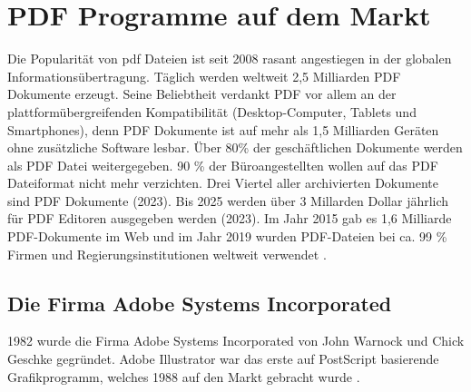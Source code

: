 \chapter{PDF Programme auf dem Markt}
Die Popularität von \gls{pdf} Dateien ist seit 2008 rasant angestiegen in der globalen Informationsübertragung. Täglich werden weltweit 2,5 Milliarden PDF Dokumente erzeugt. Seine Beliebtheit verdankt PDF vor allem an der plattformübergreifenden Kompatibilität (Desktop-Computer, Tablets und Smartphones), denn PDF Dokumente ist auf mehr als 1,5 Milliarden Geräten ohne zusätzliche Software lesbar. Über 80\% der geschäftlichen Dokumente werden als PDF Datei weitergegeben. \cite{formilo} 90 \% der Büroangestellten wollen auf das PDF Dateiformat nicht mehr verzichten. Drei Viertel aller archivierten Dokumente sind PDF Dokumente (2023).
Bis 2025 werden über 3 Millarden Dollar jährlich für PDF Editoren ausgegeben werden (2023). \cite{kofax} Im Jahr 2015 gab es 1,6 Milliarde PDF-Dokumente im Web und im Jahr 2019 wurden PDF-Dateien bei ca. 99 \% Firmen und Regierungsinstitutionen weltweit verwendet \cite{ccc-break-pdf}.

\section{Die Firma Adobe Systems Incorporated}
1982 wurde die Firma Adobe Systems Incorporated von John Warnock und Chick Geschke gegründet. Adobe Illustrator war das erste auf PostScript basierende Grafikprogramm, welches 1988 auf den Markt gebracht wurde \cite{schneeberger}.










